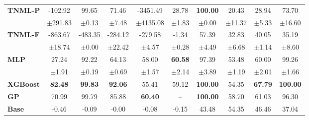 \begin{table}[ht]
\begin{tabular}{lccccc cccc}
\cmidrule(r{0.7em}){1-6} \cmidrule(l{0.7em}){7-10}
\textbf{TNML-P} & -102.92 & 99.65 & 71.46 & -3451.49 & 28.78 & \textbf{100.00} & 20.43 & 28.94 & 73.70 \\
 & $\pm$291.83 & $\pm$0.13 & $\pm$7.48 & $\pm$4135.08 & $\pm$1.83 & $\pm$0.00 & $\pm$11.37 & $\pm$5.33 & $\pm$16.60 \\
\cmidrule(r{0.7em}){1-6} \cmidrule(l{0.7em}){7-10}
\textbf{TNML-F} & -863.67 & -483.35 & -284.12 & -279.58 & -1.34 & 57.39 & 32.83 & 40.05 & 35.19 \\
 & $\pm$18.74 & $\pm$0.00 & $\pm$22.42 & $\pm$4.57 & $\pm$0.28 & $\pm$4.49 & $\pm$6.68 & $\pm$1.14 & $\pm$8.60 \\
\cmidrule(r{0.7em}){1-6} \cmidrule(l{0.7em}){7-10}
\cmidrule(r{0.7em}){1-6} \cmidrule(l{0.7em}){7-10}
\textbf{MLP} & 27.24 & 92.22 & 64.13 & 58.00 & \textbf{60.58} & 97.39 & 53.48 & 60.00 & 99.26 \\
 & $\pm$1.91 & $\pm$0.19 & $\pm$0.69 & $\pm$1.57 & $\pm$2.14 & $\pm$3.89 & $\pm$1.19 & $\pm$2.01 & $\pm$1.66 \\
\cmidrule(r{0.7em}){1-6} \cmidrule(l{0.7em}){7-10}
\textbf{XGBoost} & \textbf{82.48} & \textbf{99.83} & \textbf{92.06} & 55.41 & 59.12 & \textbf{100.00} & 54.35 & \textbf{67.79} & \textbf{100.00} \\
\cmidrule(r{0.7em}){1-6} \cmidrule(l{0.7em}){7-10}
\textbf{GP} & 70.99 & 99.79 & 85.88 & \textbf{60.40} & -- & \textbf{100.00} & 58.70 & 61.03 & 96.30 \\
\cmidrule(r{0.7em}){1-6} \cmidrule(l{0.7em}){7-10}
\textbf{Base} & -0.46 & -0.09 & -0.00 & -0.08 & -0.15 & 43.48 & 54.35 & 46.46 & 37.04 \\
\bottomrule
\end{tabular}
\end{table}